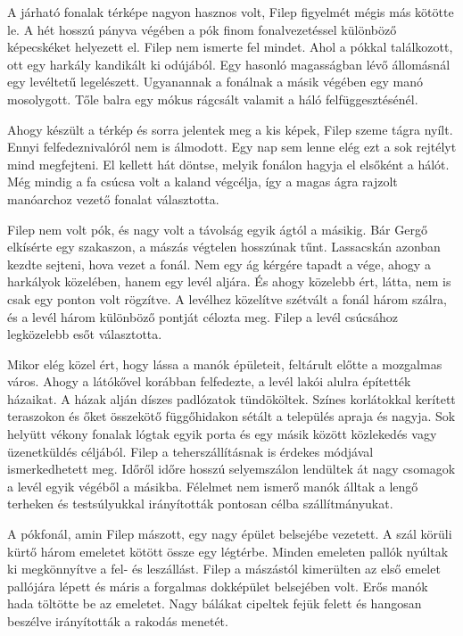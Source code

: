 \documentclass[10pt]{memoir}
\begin{document}
A járható fonalak térképe nagyon hasznos volt, Filep figyelmét mégis más
kötötte le. A hét hosszú pányva végében a pók finom fonalvezetéssel különböző
képecskéket helyezett el. Filep nem ismerte fel mindet. Ahol a pókkal
találkozott, ott egy harkály kandikált ki odújából. Egy hasonló magasságban
lévő állomásnál egy levéltetű legelészett. Ugyanannak a fonálnak a másik
végében egy manó mosolygott. Tőle balra egy mókus rágcsált valamit a háló
felfüggesztésénél.

Ahogy készült a térkép és sorra jelentek meg a kis képek, Filep szeme tágra
nyílt. Ennyi felfedeznivalóról nem is álmodott. Egy nap sem lenne elég ezt a
sok rejtélyt mind megfejteni. El kellett hát döntse, melyik fonálon hagyja el
elsőként a hálót. Még mindig a fa csúcsa volt a kaland végcélja, így a magas
ágra rajzolt manóarchoz vezető fonalat választotta.

Filep nem volt pók, és nagy volt a távolság egyik ágtól a másikig. Bár Gergő
elkísérte egy szakaszon, a mászás végtelen hosszúnak tűnt. Lassacskán azonban
kezdte sejteni, hova vezet a fonál. Nem egy ág kérgére tapadt a vége, ahogy a
harkályok közelében, hanem egy levél aljára. És ahogy közelebb ért, látta, nem
is csak egy ponton volt rögzítve. A levélhez közelítve szétvált a fonál három
szálra, és a levél három különböző pontját célozta meg. Filep a levél csúcsához
legközelebb esőt választotta.

Mikor elég közel ért, hogy lássa a manók épületeit, feltárult előtte a
mozgalmas város. Ahogy a látókővel korábban felfedezte, a levél lakói alulra
építették házaikat. A házak alján díszes padlózatok tündököltek. Színes
korlátokkal kerített teraszokon és őket összekötő függőhidakon sétált a
település apraja és nagyja. Sok helyütt vékony fonalak lógtak egyik porta és
egy másik között közlekedés vagy üzenetküldés céljából. Filep a
teherszállításnak is érdekes módjával ismerkedhetett meg. Időről időre hosszú
selyemszálon lendültek át nagy csomagok a levél egyik végéből a másikba.
Félelmet nem ismerő manók álltak a lengő terheken és testsúlyukkal irányították
pontosan célba szállítmányukat.

A pókfonál, amin Filep mászott, egy nagy épület belsejébe vezetett. A szál
körüli kürtő három emeletet kötött össze egy légtérbe. Minden emeleten pallók
nyúltak ki megkönnyítve a fel- és leszállást. Filep a mászástól kimerülten az
első emelet pallójára lépett és máris a forgalmas dokképület belsejében volt.
Erős manók hada töltötte be az emeletet. Nagy bálákat cipeltek fejük felett és
hangosan beszélve irányították a rakodás menetét.
\end{document}
